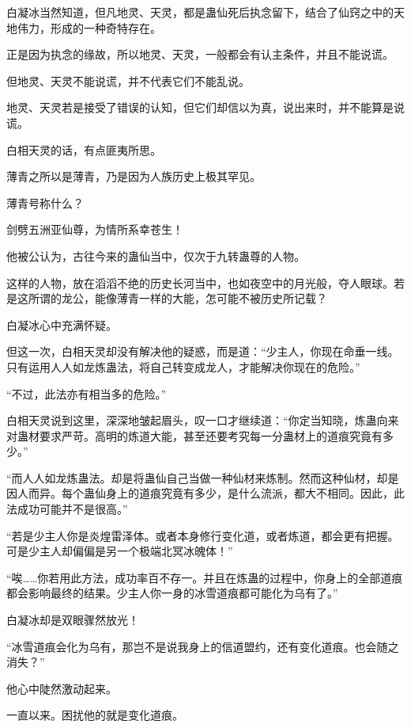 
\begin{this_body}

白凝冰当然知道，但凡地灵、天灵，都是蛊仙死后执念留下，结合了仙窍之中的天地伟力，形成的一种奇特存在。

正是因为执念的缘故，所以地灵、天灵，一般都会有认主条件，并且不能说谎。

但地灵、天灵不能说谎，并不代表它们不能乱说。

地灵、天灵若是接受了错误的认知，但它们却信以为真，说出来时，并不能算是说谎。

白相天灵的话，有点匪夷所思。

薄青之所以是薄青，乃是因为人族历史上极其罕见。

薄青号称什么？

剑劈五洲亚仙尊，为情所系幸苍生！

他被公认为，古往今来的蛊仙当中，仅次于九转蛊尊的人物。

这样的人物，放在滔滔不绝的历史长河当中，也如夜空中的月光般，夺人眼球。若是这所谓的龙公，能像薄青一样的大能，怎可能不被历史所记载？

白凝冰心中充满怀疑。

但这一次，白相天灵却没有解决他的疑惑，而是道：“少主人，你现在命垂一线。只有运用人人如龙炼蛊法，将自己转变成龙人，才能解决你现在的危险。”

“不过，此法亦有相当多的危险。”

白相天灵说到这里，深深地皱起眉头，叹一口才继续道：“你定当知晓，炼蛊向来对蛊材要求严苛。高明的炼道大能，甚至还要考究每一分蛊材上的道痕究竟有多少。”

“而人人如龙炼蛊法。却是将蛊仙自己当做一种仙材来炼制。然而这种仙材，却是因人而异。每个蛊仙身上的道痕究竟有多少，是什么流派，都大不相同。因此，此法成功可能并不是很高。”

“若是少主人你是炎煌雷泽体。或者本身修行变化道，或者炼道，都会更有把握。可是少主人却偏偏是另一个极端北冥冰魄体！”

“唉……你若用此方法，成功率百不存一。并且在炼蛊的过程中，你身上的全部道痕都会影响最终的结果。少主人你一身的冰雪道痕都可能化为乌有了。”

白凝冰却是双眼骤然放光！

“冰雪道痕会化为乌有，那岂不是说我身上的信道盟约，还有变化道痕。也会随之消失？”

他心中陡然激动起来。

一直以来。困扰他的就是变化道痕。


\end{this_body}

